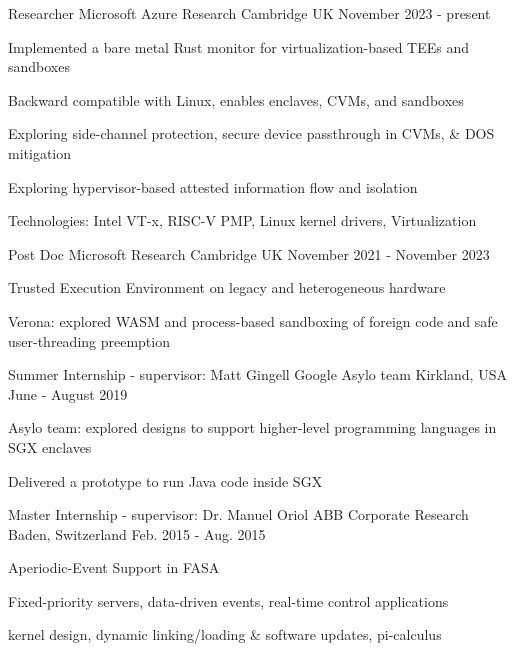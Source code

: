 


\begin{cventries}


\cventry
{Researcher}
{Microsoft Azure Research}
{Cambridge UK}
{November 2023 - present}
{
  \begin{cvitems}
  \item{Implemented a bare metal Rust monitor for virtualization-based TEEs and sandboxes}
  \item{Backward compatible with Linux, enables enclaves, CVMs, and sandboxes}
  \item{Exploring side-channel protection, secure device passthrough in CVMs, \& DOS mitigation}
  \item{Exploring hypervisor-based attested information flow and isolation}
  \item{Technologies: Intel VT-x, RISC-V PMP, Linux kernel drivers, Virtualization}
  \end{cvitems}
}

\cventry
{Post Doc}
{Microsoft Research}
{Cambridge UK}
{November 2021 - November 2023}
{
  \begin{cvitems}
  \item{Trusted Execution Environment on legacy and heterogeneous hardware}
  \item{Verona: explored WASM and process-based sandboxing of foreign code and safe user-threading preemption}
  \end{cvitems}
}

\cventry
{Summer Internship - supervisor: Matt Gingell}
{Google Asylo team}
{Kirkland, USA}
{June - August 2019}
{ 
  \begin{cvitems}
	\item{Asylo team: explored designs to support higher-level programming languages in SGX enclaves}
  \item{Delivered a prototype to run Java code inside SGX}
	\end{cvitems}
}

\cventry
{Master Internship - supervisor: Dr. Manuel Oriol}
{ABB Corporate Research}
{Baden, Switzerland}
{Feb. 2015 - Aug. 2015}
{
	\begin{cvitems}
  \item{Aperiodic-Event Support in FASA}
  \item{Fixed-priority servers, data-driven events, real-time control applications}
  \item{kernel design, dynamic linking/loading \& software updates, pi-calculus}
	\end{cvitems}
}

\end{cventries}
